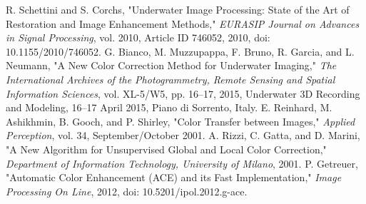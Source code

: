 \documentclass[10pt, a4paper]{extarticle}
\numberwithin{equation}{section}
\numberwithin{figure}{section}
\begin{document}
\newpage
\listoffigures
{}
\newpage
\begin{thebibliography}{99}
\begin{doublespace}
 R. Schettini and S. Corchs, "Underwater Image Processing: State of the Art of Restoration and Image Enhancement Methods," \textit{EURASIP Journal on Advances in Signal Processing}, vol. 2010, Article ID 746052, 2010, doi: 10.1155/2010/746052.
 G. Bianco, M. Muzzupappa, F. Bruno, R. Garcia, and L. Neumann, "A New Color Correction Method for Underwater Imaging," \textit{The International Archives of the Photogrammetry, Remote Sensing and Spatial Information Sciences}, vol. XL-5/W5, pp. 16–17, 2015, Underwater 3D Recording and Modeling, 16–17 April 2015, Piano di Sorrento, Italy.
 E. Reinhard, M. Ashikhmin, B. Gooch, and P. Shirley, "Color Transfer between Images," \textit{Applied Perception}, vol. 34, September/October 2001.
 A. Rizzi, C. Gatta, and D. Marini, "A New Algorithm for Unsupervised Global and Local Color Correction," \textit{Department of Information Technology, University of Milano}, 2001.
 P. Getreuer, "Automatic Color Enhancement (ACE) and its Fast Implementation," \textit{Image Processing On Line}, 2012, doi: 10.5201/ipol.2012.g-ace.
  
\end{doublespace}   
\end{thebibliography}
\end{document}
